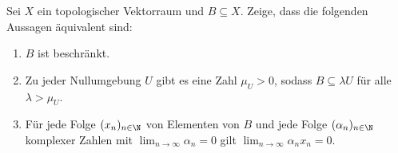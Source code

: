\begin{exercise}

Sei $X$ ein topologischer Vektorraum und $B \subseteq X$.
Zeige, dass die folgenden Aussagen äquivalent sind:

\begin{enumerate}[label = (\roman*)]
  \item $B$ ist beschränkt.
  \item Zu jeder Nullumgebung $U$ gibt es eine Zahl $\mu_U > 0$, sodass $B \subseteq \lambda U$ für alle $\lambda > \mu_U$.
  \item Für jede Folge $(x_n)_{n \in \N}$ von Elementen von $B$ und jede Folge $(\alpha_n)_{n \in \N}$ komplexer Zahlen mit $\lim_{n \to \infty} \alpha_n = 0$ gilt $\lim_{n \to \infty} \alpha_n x_n = 0$.
\end{enumerate}

\end{exercise}

